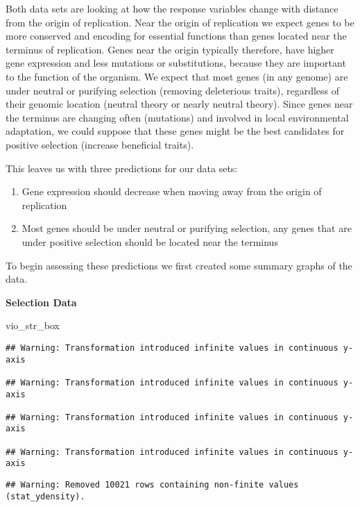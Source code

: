 \documentclass[12pt,]{article}
\newenvironment{Shaded}{\begin{snugshade}}{\end{snugshade}}
\newcommand{\NormalTok}[1]{#1}
\begin{document}
Both data sets are looking at how the response variables change with
distance from the origin of replication. Near the origin of replication
we expect genes to be more conserved and encoding for essential
functions than genes located near the terminus of replication. Genes
near the origin typically therefore, have higher gene expression and
less mutations or substitutions, because they are important to the
function of the organism. We expect that most genes (in any genome) are
under neutral or purifying selection (removing deleterious traits),
regardless of their genomic location (neutral theory or nearly neutral
theory). Since genes near the terminus are changing often (mutations)
and involved in local environmental adaptation, we could suppose that
these genes might be the best candidates for positive selection
(increase beneficial traits).

This leaves us with three predictions for our data sets:

\begin{enumerate}
\def\labelenumi{\arabic{enumi}.}
\item
  Gene expression should decrease when moving away from the origin of
  replication
\item
  Most genes should be under neutral or purifying selection, any genes
  that are under positive selection should be located near the terminus
\end{enumerate}

To begin assessing these predictions we first created some summary
graphs of the data.

\textbf{Selection Data}

\begin{Shaded}
\begin{Highlighting}[]
\NormalTok{vio_str_box}
\end{Highlighting}
\end{Shaded}

\begin{verbatim}
## Warning: Transformation introduced infinite values in continuous y-axis

## Warning: Transformation introduced infinite values in continuous y-axis

## Warning: Transformation introduced infinite values in continuous y-axis

## Warning: Transformation introduced infinite values in continuous y-axis
\end{verbatim}

\begin{verbatim}
## Warning: Removed 10021 rows containing non-finite values (stat_ydensity).
\end{verbatim}
\end{document}
